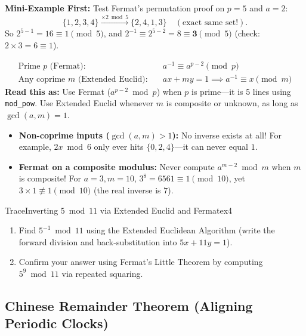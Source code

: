 \documentclass[11pt,a4paper]{article}
\theoremstyle{definition}
\newcommand{\examplebeat}{\textbf{\color{primaryblue}Mini-Example First:} }
\begin{document}
\examplebeat Test Fermat's permutation proof on $p = 5$ and $a = 2$:
\[
    \{1, 2, 3, 4\} \xrightarrow{\times 2 \bmod 5} \{2, 4, 1, 3\} \quad (\text{exact same set!}).
\]
So $2^{5 - 1} = 16 \equiv 1 \pmod 5$, and $2^{-1} \equiv 2^{5 - 2} = 8 \equiv \mathbf{3} \pmod 5$ (check: $2 \times 3 = 6 \equiv 1$).

\begin{formulabox}
\[
\begin{aligned}
    \text{Prime } p \text{ (Fermat):}\quad & a^{-1} \equiv a^{p - 2} \pmod p \\
    \text{Any coprime } m \text{ (Extended Euclid):}\quad & a x + m y = 1 \implies a^{-1} \equiv x \pmod m
\end{aligned}
\]
\textbf{Read this as:} Use Fermat ($a^{p-2} \bmod p$) when $p$ is prime---it is 5 lines using \texttt{mod\_pow}. Use Extended Euclid whenever $m$ is composite or unknown, as long as $\gcd(a, m) = 1$.
\end{formulabox}

\begin{watchoutbox}
\begin{itemize}
    \item \textbf{Non-coprime inputs ($\gcd(a, m) > 1$):} No inverse exists at all! For example, $2x \bmod 6$ only ever hits $\{0, 2, 4\}$---it can never equal $1$.
    \item \textbf{Fermat on a composite modulus:} Never compute $a^{m - 2} \bmod m$ when $m$ is composite! For $a = 3, m = 10$, $3^{8} = 6561 \equiv 1 \pmod{10}$, yet $3 \times 1 \not\equiv 1 \pmod{10}$ (the real inverse is $7$).
\end{itemize}
\end{watchoutbox}

\begin{tryitbox}{Trace}{Inverting $5 \bmod 11$ via Extended Euclid and Fermat}{ex4}
\begin{enumerate}
    \item Find $5^{-1} \bmod 11$ using the Extended Euclidean Algorithm (write the forward division and back-substitution into $5x + 11y = 1$).
    \item Confirm your answer using Fermat's Little Theorem by computing $5^9 \bmod 11$ via repeated squaring.
\end{enumerate}
\end{tryitbox}

\subsection{Chinese Remainder Theorem (Aligning Periodic Clocks)}
\end{document}
